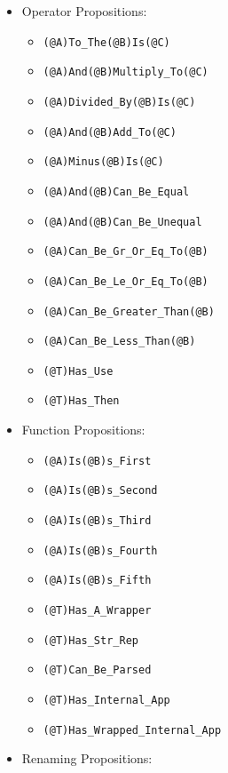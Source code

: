 \documentclass{article}
\begin{document}
\begin{itemize}

\item Operator Propositions:

  \begin{itemize}
  \item \verb|(@A)To_The(@B)Is(@C)|
  \item \verb|(@A)And(@B)Multiply_To(@C)|
  \item \verb|(@A)Divided_By(@B)Is(@C)|
  \item \verb|(@A)And(@B)Add_To(@C)|
  \item \verb|(@A)Minus(@B)Is(@C)|
  \item \verb|(@A)And(@B)Can_Be_Equal|
  \item \verb|(@A)And(@B)Can_Be_Unequal|
  \item \verb|(@A)Can_Be_Gr_Or_Eq_To(@B)|
  \item \verb|(@A)Can_Be_Le_Or_Eq_To(@B)|
  \item \verb|(@A)Can_Be_Greater_Than(@B)|
  \item \verb|(@A)Can_Be_Less_Than(@B)|
  \item \verb|(@T)Has_Use|
  \item \verb|(@T)Has_Then|
  \end{itemize}

\item Function Propositions:

  \begin{itemize}
  \item \verb|(@A)Is(@B)s_First|
  \item \verb|(@A)Is(@B)s_Second|
  \item \verb|(@A)Is(@B)s_Third|
  \item \verb|(@A)Is(@B)s_Fourth|
  \item \verb|(@A)Is(@B)s_Fifth|
  \item \verb|(@T)Has_A_Wrapper|
  \item \verb|(@T)Has_Str_Rep|
  \item \verb|(@T)Can_Be_Parsed|
  \item \verb|(@T)Has_Internal_App|
  \item \verb|(@T)Has_Wrapped_Internal_App|
  \end{itemize}

\item Renaming Propositions:


\end{itemize}
\end{document}
